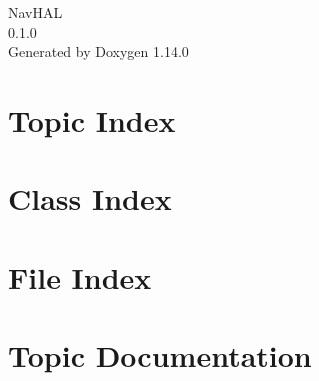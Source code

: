 \documentclass[twoside]{book}
\newcommand{\+}{\discretionary{\mbox{\scriptsize$\hookleftarrow$}}{}{}}
\newcommand{\clearemptydoublepage}{%
    \newpage{\pagestyle{empty}\cleardoublepage}%
  }
\begin{document}
  \raggedbottom
    \hypersetup{pageanchor=false,
                bookmarksnumbered=true,
                pdfencoding=unicode
               }
  \begin{titlepage}
  \vspace*{7cm}
  \begin{center}%
  {\Large Nav\+HAL}\\
  [1ex]\large 0.\+1.\+0 \\
  \vspace*{1cm}
  {\large Generated by Doxygen 1.14.0}\\
  \end{center}
  \end{titlepage}
  \clearemptydoublepage
  \tableofcontents
  \clearemptydoublepage
  \hypersetup{pageanchor=true}














\chapter{Topic Index}

\chapter{Class Index}

\chapter{File Index}

\chapter{Topic Documentation}




\end{document}
